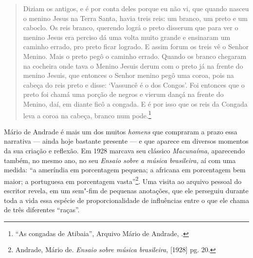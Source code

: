 \begin{quote}
Diziam os antigos, e é por conta deles porque eu não vi, que quando
nasceu o menino Jesus na Terra Santa, havia treis reis: um branco, um
preto e um caboclo. Os reis branco, querendo lográ o preto disserum que
para ver o menino Jesus era perciso dá uma volta muito grande e
ensinaram um caminho errado, pro preto ficar logrado. E assim forum os
treis vê o Senhor Menino. Mais o preto pegô o caminho errado. Quando os
branco chegaram na cocheira onde tava o Menino Jesuis derum com o preto
já na frente do menino Jesuis, que entonces o Senhor menino pegô uma
coroa, pois na cabeça do reis preto e disse: `Vassuncê é o dos Congos'.
Foi entonces que o preto foi chamá uma porção de negros e vierum dançá
na frente do Menino, daí, em diante ficô a congada. E é por isso que os
reis da Congada leva a coroa na cabeça, branco num pode.\footnote{``As
  congadas de Atibaia'', Arquivo Mário de Andrade, .}
\end{quote}

Mário de Andrade é mais um dos muitos \emph{homens} que compraram a
prazo essa narrativa --- ainda hoje bastante presente --- e que aparece em
diversos momentos da sua criação e reflexão. Em 1928 marcava seu
clássico \emph{Macunaíma}, aparecendo também, no mesmo ano, no seu
\emph{Ensaio sobre a música brasileira,} aí com uma medida: ``a
ameríndia em porcentagem pequena; a africana em porcentagem bem maior; a
portuguesa em porcentagem vasta''\footnote{Andrade, Mário de.
  \emph{Ensaio sobre música brasileira}, {[}1928{]} pg. 20.}. Uma visita
ao arquivo pessoal do escritor revela, em um sem"-fim de pequenas
anotações, que ele perseguiu durante toda a vida essa espécie de
proporcionalidade de influências entre o que ele chama de três
diferentes ``raças''.

